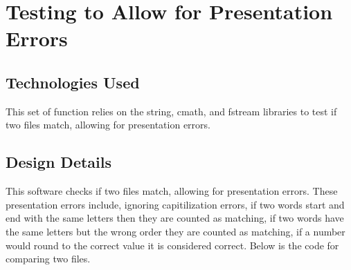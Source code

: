 \section {Testing to Allow for Presentation Errors}

\subsection {Technologies Used}
This set of function relies on the string, cmath, and fstream libraries to test if two
files match, allowing for presentation errors.

\subsection {Design Details}
This software checks if two files match, allowing for presentation errors.  These presentation
errors include, ignoring capitilization errors, if two words start and end with the same letters
then they are counted as matching, if two words have the same letters but the wrong
order they are counted as matching, if a number would round to the correct value it is
considered correct.  Below is the code for comparing two files.

